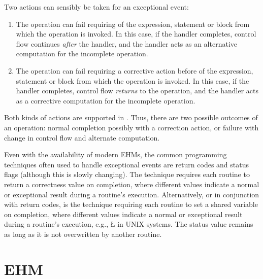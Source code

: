 \documentclass[openright,twoside]{report}
\begin{document}
Two actions can sensibly be taken for an exceptional event:
\begin{enumerate}
\item
The operation can fail requiring  of the expression, statement or block from which the operation is invoked.
In this case, if the handler completes, control flow continues \emph{after} the handler, and the handler acts as an alternative computation for the incomplete operation.

\item
The operation can fail requiring a corrective action before  of the expression, statement or block from which the operation is invoked.
In this case, if the handler completes, control flow \emph{returns} to the operation, and the handler acts as a corrective computation for the incomplete operation. 
\end{enumerate}
Both kinds of actions are supported in \uC.
Thus, there are two possible outcomes of an operation: normal completion possibly with a correction action, or failure with change in control flow and alternate computation.

\begin{annotation}
Even with the availability of modern EHMs, the common programming techniques often used to handle exceptional events are return codes and status flags (although this is slowly changing).
The  technique requires each routine to return a correctness value on completion, where different values indicate a normal or exceptional result during a routine's execution.
Alternatively, or in conjunction with return codes, is the  technique requiring each routine to set a shared variable on completion, where different values indicate a normal or exceptional result during a routine's execution, e.g., \LGinlinetrue\LGbegin\lgrinde\L{}\endlgrinde\LGend{} in UNIX systems.
The status value remains as long as it is not overwritten by another routine.
\end{annotation}


\section{\texorpdfstring{\uC EHM}{uC++ EHM}}
\end{document}
